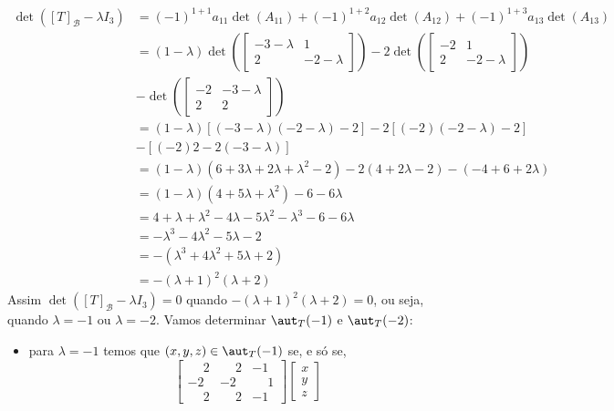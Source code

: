 \begin{exemplo}
\begin{enumerate}[label={\arabic*})]
\begin{solucao}
\begin{align*}
                \det([T]_\mathcal{B} - \lambda I_3) &= (-1)^{1 + 1}a_{11}\det(A_{11}) + (-1)^{1 + 2}a_{12}\det(A_{12}) + (-1)^{1 + 3}a_{13}\det(A_{13}) \\ &= (1 - \lambda)\det\left(\begin{bmatrix}-3 - \lambda & 1\\2 & -2 - \lambda\end{bmatrix}\right) - 2\det\left(\begin{bmatrix}-2 & 1\\2 & -2 - \lambda\end{bmatrix}\right) \\ &-\det\left(\begin{bmatrix}-2 & -3 - \lambda\\2 & 2\end{bmatrix}\right)\\ &= (1 - \lambda)[(-3 - \lambda)(-2 - \lambda) - 2] - 2[(-2)(-2 - \lambda) - 2]  \\ &- [(-2)2 - 2(-3 - \lambda)] \\ &= (1 - \lambda)(6 + 3\lambda + 2\lambda + \lambda^2 - 2) - 2(4 + 2\lambda - 2) - (-4 + 6 + 2\lambda) \\ &= (1 - \lambda)(4 + 5\lambda + \lambda^2) - 6 - 6\lambda \\ &= 4 + \lambda + \lambda^2 - 4\lambda - 5\lambda^2 - \lambda^3 - 6 - 6\lambda \\ &= -\lambda^3 - 4\lambda^2 - 5\lambda - 2 \\ &= -(\lambda^3 + 4\lambda^2 + 5\lambda + 2) \\ &= -(\lambda + 1)^2(\lambda + 2)
            \end{align*}
            Assim $\det([T]_\mathcal{B} - \lambda I_3) = 0$ quando $-(\lambda + 1)^2(\lambda + 2) = 0$, ou seja, quando $\lambda = -1$ ou $\lambda = -2$.
            Vamos determinar $\aut_T(-1)$ e $\aut_T(-2)$:
            \begin{itemize}
                \item para $\lambda = -1$ temos que $(x,y,z) \in \aut_T(-1)$ se, e s\'o se,
                \[
                    \begin{bmatrix}
                        \phantom{-}2 & \phantom{-}2 & -1\\
                        -2 & -2 & \phantom{-}1\\
                        \phantom{-}2 & \phantom{-}2 & -1
                    \end{bmatrix}\begin{bmatrix}
                        x\\y\\z

\end{bmatrix}\]
\end{itemize}
\end{solucao}
\end{enumerate}
\end{exemplo}

